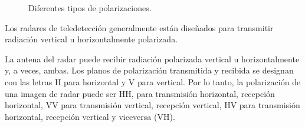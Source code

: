 \begin{figure}[hbt]
	\centering    
	 \qquad
	\caption{\label{PolarizacionCircularLineal}Diferentes tipos de polarizaciones.}
\end{figure} 

Los radares de teledetección generalmente están diseñados para transmitir radiación vertical u horizontalmente polarizada. 

La antena del radar puede recibir radiación polarizada vertical u horizontalmente y, a veces, ambas. Los planos de polarización transmitida y recibida se designan con las letras H para horizontal y V para vertical. Por lo tanto, la polarización de una imagen de radar puede ser HH, para transmisión horizontal, recepción horizontal, VV para transmisión vertical, recepción vertical, HV para transmisión horizontal, recepción vertical y viceversa (VH).

